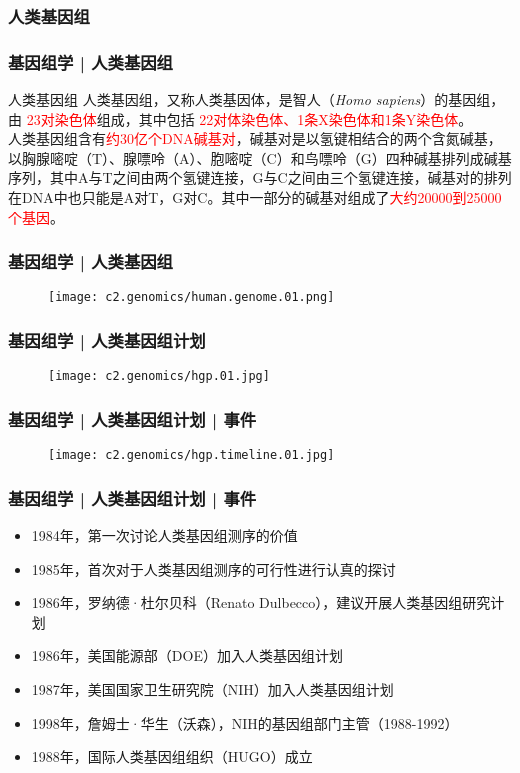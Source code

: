 \subsubsection{人类基因组}
\begin{frame}
  \frametitle{基因组学 | 人类基因组}
  \begin{block}{人类基因组}
    人类基因组，又称人类基因体，是智人（\textit{Homo sapiens}）的基因组，由 \textcolor{red}{23对染色体}组成，其中包括 \textcolor{red}{22对体染色体、1条X染色体和1条Y染色体}。\\
    \vspace{1em}
人类基因组含有\textcolor{red}{约30亿个DNA碱基对}，碱基对是以氢键相结合的两个含氮碱基，以胸腺嘧啶（T）、腺嘌呤（A）、胞嘧啶（C）和鸟嘌呤（G）四种碱基排列成碱基序列，其中A与T之间由两个氢键连接，G与C之间由三个氢键连接，碱基对的排列在DNA中也只能是A对T，G对C。其中一部分的碱基对组成了\textcolor{red}{大约20000到25000个基因}。
  \end{block}
\end{frame}

\begin{frame}
  \frametitle{基因组学 | 人类基因组}
  \begin{figure}
    \centering
    \texttt{[image: c2.genomics/human.genome.01.png]}
  \end{figure}
\end{frame}

\begin{frame}
  \frametitle{基因组学 | 人类基因组计划}
  \begin{figure}
    \centering
    \texttt{[image: c2.genomics/hgp.01.jpg]}
  \end{figure}
\end{frame}

\begin{frame}
  \frametitle{基因组学 | 人类基因组计划 | 事件}
  \begin{figure}
    \centering
    \texttt{[image: c2.genomics/hgp.timeline.01.jpg]}
  \end{figure}
\end{frame}

\begin{frame}
  \frametitle{基因组学 | 人类基因组计划 | 事件}
  \begin{itemize}
    \item 1984年，第一次讨论人类基因组测序的价值
    \item 1985年，首次对于人类基因组测序的可行性进行认真的探讨
    \item 1986年，罗纳德·杜尔贝科（Renato Dulbecco），建议开展人类基因组研究计划
    \item 1986年，美国能源部（DOE）加入人类基因组计划
    \item 1987年，美国国家卫生研究院（NIH）加入人类基因组计划
    \item 1998年，詹姆士·华生（沃森），NIH的基因组部门主管（1988-1992）
    \item 1988年，国际人类基因组组织（HUGO）成立
  \end{itemize}
\end{frame}

